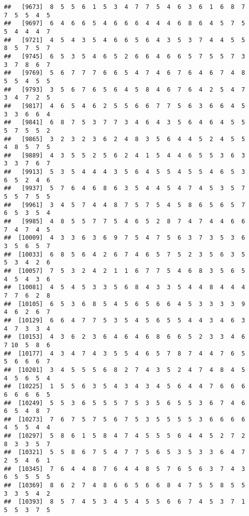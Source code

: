 \documentclass[
]{book}
\begin{document}
\begin{verbatim}
##   [9673]  8  5  5  6  1  5  3  4  7  7  5  4  6  3  6  1  6  8  7  7  5  5  4  5
##   [9697]  6  4  6  6  5  4  6  6  6  4  4  4  6  8  6  4  5  7  5  5  4  4  4  7
##   [9721]  4  5  4  3  5  4  6  6  5  6  4  3  5  3  7  4  4  5  5  8  5  7  5  7
##   [9745]  6  5  3  5  4  6  5  2  6  6  4  6  6  5  7  5  5  7  3  3  7  8  6  7
##   [9769]  5  6  7  7  7  6  6  5  4  7  4  6  7  6  4  6  7  4  8  5  5  4  5  5
##   [9793]  3  5  6  7  6  5  6  4  5  8  4  6  7  6  4  2  5  4  7  3  4  7  2  5
##   [9817]  4  6  5  4  6  2  5  5  6  6  7  7  5  6  3  6  6  4  5  3  3  6  6  4
##   [9841]  6  8  7  5  3  7  7  3  4  6  4  3  5  6  4  6  4  5  5  5  7  5  5  2
##   [9865]  3  2  3  2  3  6  2  4  8  3  5  6  4  4  5  2  4  5  5  4  8  5  7  5
##   [9889]  4  3  5  5  2  5  6  2  4  1  5  4  4  6  5  5  3  6  3  3  3  7  6  7
##   [9913]  5  3  5  4  4  4  3  5  6  4  5  5  4  5  5  4  6  5  3  6  5  2  4  6
##   [9937]  5  7  6  4  6  8  6  3  5  4  4  5  4  7  4  5  3  5  7  5  5  7  5  5
##   [9961]  3  4  5  7  4  4  8  7  5  7  5  4  5  8  6  5  6  5  7  6  5  3  5  4
##   [9985]  4  8  5  5  7  7  5  4  6  5  2  8  7  4  7  4  4  6  6  7  4  7  4  5
##  [10009]  4  3  3  6  3  6  9  7  5  4  7  5  6  3  7  3  5  3  6  3  5  6  5  7
##  [10033]  6  8  5  6  4  2  6  7  4  6  5  7  5  2  3  5  6  3  5  5  3  4  2  6
##  [10057]  7  5  3  2  4  2  1  1  6  7  7  5  4  6  8  3  5  6  5  4  5  4  3  6
##  [10081]  4  5  4  5  3  3  5  6  8  4  3  3  5  4  4  8  4  4  4  7  7  6  2  8
##  [10105]  6  5  3  6  8  5  4  5  6  5  6  6  4  5  3  3  3  3  9  4  6  2  6  7
##  [10129]  6  6  4  7  7  5  3  5  4  5  6  5  5  4  4  3  4  6  3  4  7  3  3  4
##  [10153]  4  3  6  2  3  6  4  6  4  6  8  6  6  5  2  3  3  4  6  7 10  5  8  6
##  [10177]  4  3  4  7  4  3  5  5  4  6  5  7  8  7  4  4  7  6  5  5  6  6  6  7
##  [10201]  3  4  5  5  5  6  8  2  7  4  3  5  2  4  7  4  8  4  5  4  5  6  5  4
##  [10225]  1  5  5  6  3  5  4  3  4  3  4  5  6  4  4  7  6  6  6  6  6  6  6  5
##  [10249]  5  5  3  6  5  5  5  7  5  3  5  6  5  5  3  6  7  4  6  6  5  4  8  7
##  [10273]  7  6  7  5  7  5  6  7  5  3  5  5  5  5  3  6  6  6  6  4  5  5  4  4
##  [10297]  5  8  6  1  5  8  4  7  4  5  5  5  6  4  4  5  2  7  2  8  3  3  5  7
##  [10321]  5  5  8  6  7  5  4  7  7  5  6  5  3  5  3  3  6  4  7  2  5  4  6  1
##  [10345]  7  6  4  4  8  7  6  4  4  8  5  7  6  5  6  3  7  4  3  6  5  5  5  5
##  [10369]  8  6  2  7  4  8  6  6  5  6  6  8  4  7  5  5  8  5  5  3  3  5  4  2
##  [10393]  8  5  7  4  5  3  4  5  4  5  5  6  6  7  4  5  3  7  1  5  5  3  7  5

\end{verbatim}
\end{document}
